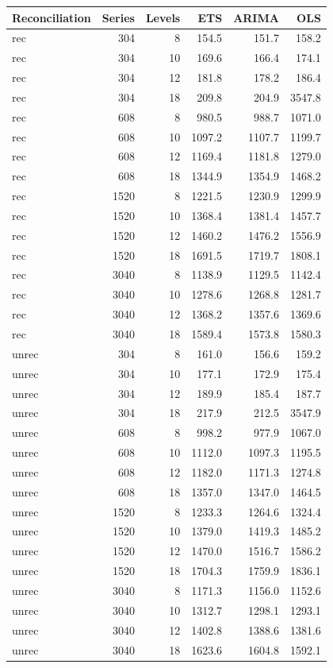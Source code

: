 \documentclass[11pt,a4paper,]{article}
\let\origtable\table
\let\endorigtable\endtable
\renewenvironment{table}[1][2] {
    \expandafter\origtable\expandafter[!htbp]
} {
    \endorigtable
}
\begin{document}
\begin{table}[!h]
\caption{\label{tab:TourismdatasimfixlevelNS}Mean RMSE on 8, 10, 12 and 18 levels of hierarchy with 304, 608, 1520 and 3040 number of bottom level series for ETS, ARIMA and OLS with and without reconciliation - two years forecast points with 0.5 error value - Fixed origin - Simulated tourism dataset}
\centering
\begin{tabular}[t]{lrrrrr}
\toprule
Reconciliation & Series & Levels & ETS & ARIMA & OLS\\
\midrule
rec & 304 & 8 & 154.5 & 151.7 & 158.2\\
rec & 304 & 10 & 169.6 & 166.4 & 174.1\\
rec & 304 & 12 & 181.8 & 178.2 & 186.4\\
rec & 304 & 18 & 209.8 & 204.9 & 3547.8\\
rec & 608 & 8 & 980.5 & 988.7 & 1071.0\\
rec & 608 & 10 & 1097.2 & 1107.7 & 1199.7\\
rec & 608 & 12 & 1169.4 & 1181.8 & 1279.0\\
rec & 608 & 18 & 1344.9 & 1354.9 & 1468.2\\
rec & 1520 & 8 & 1221.5 & 1230.9 & 1299.9\\
rec & 1520 & 10 & 1368.4 & 1381.4 & 1457.7\\
rec & 1520 & 12 & 1460.2 & 1476.2 & 1556.9\\
rec & 1520 & 18 & 1691.5 & 1719.7 & 1808.1\\
rec & 3040 & 8 & 1138.9 & 1129.5 & 1142.4\\
rec & 3040 & 10 & 1278.6 & 1268.8 & 1281.7\\
rec & 3040 & 12 & 1368.2 & 1357.6 & 1369.6\\
rec & 3040 & 18 & 1589.4 & 1573.8 & 1580.3\\
unrec & 304 & 8 & 161.0 & 156.6 & 159.2\\
unrec & 304 & 10 & 177.1 & 172.9 & 175.4\\
unrec & 304 & 12 & 189.9 & 185.4 & 187.7\\
unrec & 304 & 18 & 217.9 & 212.5 & 3547.9\\
unrec & 608 & 8 & 998.2 & 977.9 & 1067.0\\
unrec & 608 & 10 & 1112.0 & 1097.3 & 1195.5\\
unrec & 608 & 12 & 1182.0 & 1171.3 & 1274.8\\
unrec & 608 & 18 & 1357.0 & 1347.0 & 1464.5\\
unrec & 1520 & 8 & 1233.3 & 1264.6 & 1324.4\\
unrec & 1520 & 10 & 1379.0 & 1419.3 & 1485.2\\
unrec & 1520 & 12 & 1470.0 & 1516.7 & 1586.2\\
unrec & 1520 & 18 & 1704.3 & 1759.9 & 1836.1\\
unrec & 3040 & 8 & 1171.3 & 1156.0 & 1152.6\\
unrec & 3040 & 10 & 1312.7 & 1298.1 & 1293.1\\
unrec & 3040 & 12 & 1402.8 & 1388.6 & 1381.6\\
unrec & 3040 & 18 & 1623.6 & 1604.8 & 1592.1\\
\bottomrule
\end{tabular}
\end{table}
\end{document}
